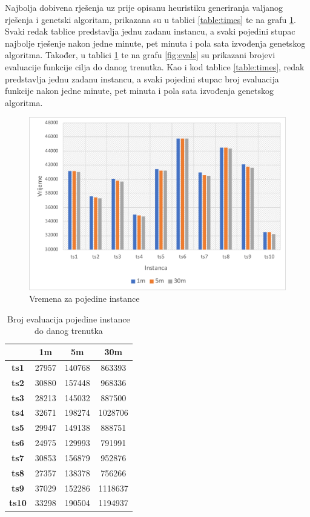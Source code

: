\documentclass[utf8, seminar, numeric]{fer}
\begin{document}
Najbolja dobivena rješenja uz prije opisanu heuristiku generiranja valjanog rješenja i genetski algoritam, prikazana su u tablici \ref{table:times} te na grafu \ref{fig:times}. Svaki redak tablice predstavlja jednu zadanu instancu, a svaki pojedini stupac najbolje rješenje nakon jedne minute, pet minuta i pola sata izvođenja genetskog algoritma. Također, u tablici \ref{table:evals} te na grafu \ref{fig:evals} su prikazani brojevi evaluacije funkcije cilja do danog trenutka. Kao i kod tablice \ref{table:times}, redak predstavlja jednu zadanu instancu, a svaki pojedini stupac broj evaluacija funkcije nakon jedne minute, pet minuta i pola sata izvođenja genetskog algoritma.

\begin{figure}[H]
	\centering
	\includegraphics[width=1.0\textwidth]{times.pdf}
	\caption{Vremena za pojedine instance}
	\label{fig:times}
\end{figure}

\begin{table}
\centering
\caption{Broj evaluacija pojedine instance do danog trenutka}
\label{table:evals}
\begin{tabular}{|c|c|c|c|}
\hline
              & \textbf{1m} & \textbf{5m} & \textbf{30m} \\ \hline
\textbf{ts1}  & 27957       & 140768      & 863393       \\ \hline
\textbf{ts2}  & 30880       & 157448      & 968336       \\ \hline
\textbf{ts3}  & 28213       & 145032      & 887500       \\ \hline
\textbf{ts4}  & 32671       & 198274      & 1028706      \\ \hline
\textbf{ts5}  & 29947       & 149138      & 888751       \\ \hline
\textbf{ts6}  & 24975       & 129993      & 791991       \\ \hline
\textbf{ts7}  & 30853       & 156879      & 952876       \\ \hline
\textbf{ts8}  & 27357       & 138378      & 756266       \\ \hline
\textbf{ts9}  & 37029       & 152286      & 1118637      \\ \hline
\textbf{ts10} & 33298       & 190504      & 1194937      \\ \hline
\end{tabular}
\end{table}
\end{document}
